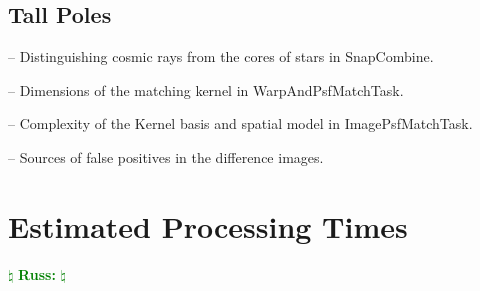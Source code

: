 \documentclass[12pt]{article}
\newcommand{\russ} { \textcolor{green} {
\ensuremath{\natural} {\bf Russ:}  
\ensuremath{\natural} } }
\begin{document}
\subsection{Tall Poles}

-- Distinguishing cosmic rays from the cores of stars in SnapCombine.

-- Dimensions of the matching kernel in WarpAndPsfMatchTask.

-- Complexity of the Kernel basis and spatial model in ImagePsfMatchTask.

-- Sources of false positives in the difference images.



\clearpage 
\section{Estimated Processing Times} \russ
\end{document}
